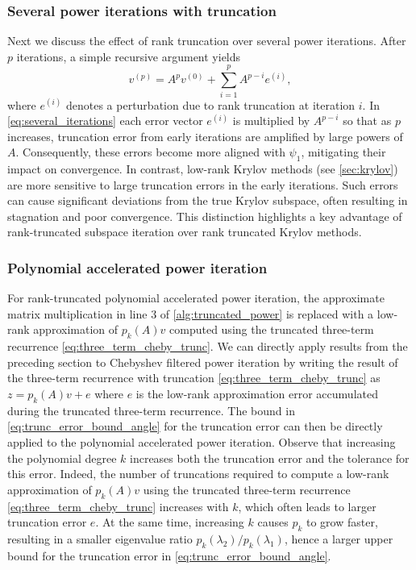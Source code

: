 \documentclass[10pt,preprint]{elsarticle}
\begin{document}
\subsubsection{Several power iterations with truncation}
\label{sec:several_iters}

Next we discuss the effect of rank truncation over several power iterations. After $p$ iterations, a simple recursive argument yields
\begin{equation} \label{eq:several_iterations}
    v^{(p)} = A^p v^{(0)} + \sum_{i=1}^p A^{p-i} e^{(i)}, 
\end{equation}
where $e^{(i)}$ denotes a perturbation due to rank truncation at iteration $i$. In \eqref{eq:several_iterations} each error vector $e^{(i)}$ is multiplied by $A^{p-i}$ so that as $p$ increases, truncation error from early iterations are amplified by large powers of $A$. Consequently, these errors become more aligned with $\psi_1$, mitigating their impact on convergence. 
%
In contrast, low-rank Krylov methods (see \cref{sec:krylov}) are more sensitive to large truncation errors in the early iterations. Such errors can cause significant deviations from the true Krylov subspace, often resulting in stagnation and poor convergence. This distinction highlights a key advantage of rank-truncated subspace iteration over rank truncated Krylov methods. 

\subsubsection{Polynomial accelerated power iteration} 
\label{sec:poly_filter} 

For rank-truncated polynomial accelerated power iteration, the approximate matrix multiplication in line 3 of \cref{alg:truncated_power} is replaced with a low-rank approximation of $p_k(A)v$ computed using the truncated three-term recurrence \eqref{eq:three_term_cheby_trunc}. We can directly apply results from the preceding section to Chebyshev filtered power iteration by writing the result of the three-term recurrence with truncation \eqref{eq:three_term_cheby_trunc} as $z = p_k(A)v + e$ where $e$ is the low-rank approximation error accumulated during the truncated three-term recurrence. The bound in \eqref{eq:trunc_error_bound_angle} for the truncation error can then be directly applied to the polynomial accelerated power iteration. 
%
Observe that increasing the polynomial degree $k$ increases both the truncation error and the tolerance for this error. Indeed, the number of truncations required to compute a low-rank approximation of $p_k(A)v$ using the truncated three-term recurrence \eqref{eq:three_term_cheby_trunc} increases with $k$, which often leads to larger truncation error $e$. At the same time, increasing $k$ causes $p_k$ to grow faster, resulting in a smaller eigenvalue ratio $p_k(\lambda_2)/p_k(\lambda_1)$, hence a larger upper bound for the truncation error in \eqref{eq:trunc_error_bound_angle}. 
\end{document}
